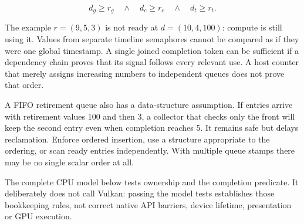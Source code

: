 \[
d_g\ge r_g\quad\land\quad d_c\ge r_c\quad\land\quad d_t\ge r_t.
\]

The example \(r=(9,5,3)\) is not ready at \(d=(10,4,100)\): compute is still using it. Values from separate timeline semaphores cannot be compared as if they were one global timestamp. A single joined completion token can be sufficient if a dependency chain proves that its signal follows every relevant use. A host counter that merely assigns increasing numbers to independent queues does not prove that order.

A FIFO retirement queue also has a data-structure assumption. If entries arrive with retirement values 100 and then 3, a collector that checks only the front will keep the second entry even when completion reaches 5. It remains safe but delays reclamation. Enforce ordered insertion, use a structure appropriate to the ordering, or scan ready entries independently. With multiple queue stamps there may be no single scalar order at all.

The complete CPU model below tests ownership and the completion predicate. It deliberately does not call Vulkan: passing the model tests establishes those bookkeeping rules, not correct native API barriers, device lifetime, presentation or GPU execution.

